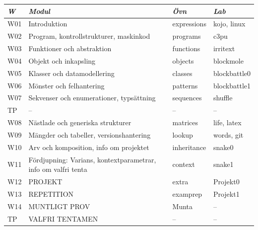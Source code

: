 \begin{tabular}{l|l|l|l}
\textit{W} & \textit{Modul} & \textit{Övn} & \textit{Lab} \\ \hline \hline
W01 & Introduktion & expressions & kojo, linux \\
W02 & Program, kontrollstrukturer, maskinkod & programs & c3pu \\
W03 & Funktioner och abstraktion & functions & irritext \\
W04 & Objekt och inkapsling & objects & blockmole \\
W05 & Klasser och datamodellering & classes & blockbattle0 \\
W06 & Mönster och felhantering & patterns & blockbattle1 \\
W07 & Sekvenser och enumerationer, typsättning & sequences & shuffle \\
TP & -- & -- & -- \\
W08 & Nästlade och generiska strukturer & matrices & life, latex \\
W09 & Mängder och tabeller, versionshantering & lookup & words, git \\
W10 & Arv och komposition, info om projektet & inheritance & snake0 \\
W11 & Fördjupning: Varians, kontextparametrar, info om valfri tenta & context & snake1 \\
W12 & PROJEKT & extra & Projekt0 \\
W13 & REPETITION & examprep & Projekt1 \\
W14 & MUNTLIGT PROV & Munta & -- \\
TP & VALFRI TENTAMEN & -- & -- \\
\end{tabular}
